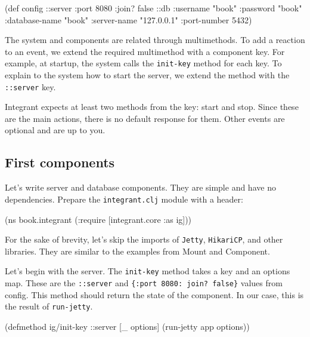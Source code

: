 \begin{english}
  \begin{clojure}
(def config
  {::server {:port 8080 :join? false}
   ::db {:username      "book"
         :password      "book"
         :database-name "book"
         :server-name   "127.0.0.1"
         :port-number   5432}})
  \end{clojure}
\end{english}


The system and components are related through multimethods. To add a reaction to an event, we extend the required multimethod with a component key. For example, at startup, the system calls the \verb|init-key| method for each key. To explain to the system how to start the server, we extend the method with the \verb|::server| key.

Integrant expects at least two methods from the key: start and stop. Since these are the main actions, there is no default response for them. Other events are optional and are up to you.

\subsection{First components}


Let's write server and database components. They are simple and have no dependencies. Prepare the \verb|integrant.clj| module with a header:

\begin{english}
  \begin{clojure}
(ns book.integrant
  (:require [integrant.core :as ig]))
  \end{clojure}
\end{english}

For the sake of brevity, let's skip the imports of \verb|Jetty|, \verb|HikariCP|, and other libraries. They are similar to the examples from Mount and Component.

Let's begin with the server. The \verb|init-key| method takes a key and an options map. These are the \verb|::server| and \verb|{:port 8080: join? false}| values from config. This method should return the state of the component. In our case, this is the result of \verb|run-jetty|.

\begin{english}
  \begin{clojure}
(defmethod ig/init-key ::server
  [_ options]
  (run-jetty app options))
  \end{clojure}
\end{english}

